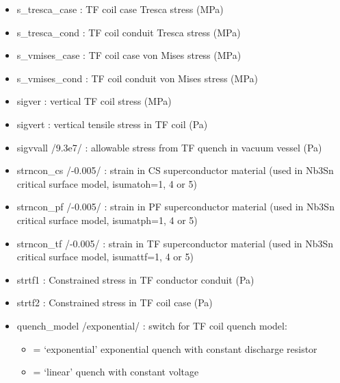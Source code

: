 \documentclass[]{article}
\providecommand{\tightlist}{%
  \setlength{\itemsep}{0pt}\setlength{\parskip}{0pt}}
\begin{document}
\begin{itemize}
\begin{itemize}
  \item
    s\_tresca\_case : TF coil case Tresca stress (MPa)
  \item
    s\_tresca\_cond : TF coil conduit Tresca stress (MPa)
  \item
    s\_vmises\_case : TF coil case von Mises stress (MPa)
  \item
    s\_vmises\_cond : TF coil conduit von Mises stress (MPa)
  \item
    sigver : vertical TF coil stress (MPa)
  \item
    sigvert : vertical tensile stress in TF coil (Pa)
  \item
    sigvvall /9.3e7/ : allowable stress from TF quench in vacuum vessel
    (Pa)
  \item
    strncon\_cs /-0.005/ : strain in CS superconductor material (used in
    Nb3Sn critical surface model, isumatoh=1, 4 or 5)
  \item
    strncon\_pf /-0.005/ : strain in PF superconductor material (used in
    Nb3Sn critical surface model, isumatph=1, 4 or 5)
  \item
    strncon\_tf /-0.005/ : strain in TF superconductor material (used in
    Nb3Sn critical surface model, isumattf=1, 4 or 5)
  \item
    strtf1 : Constrained stress in TF conductor conduit (Pa)
  \item
    strtf2 : Constrained stress in TF coil case (Pa)
  \item
    quench\_model /exponential/ : switch for TF coil quench model:

    \begin{itemize}
    \tightlist
    \item
      = `exponential' exponential quench with constant discharge
      resistor
    \item
      = `linear' quench with constant voltage
    \end{itemize}


\end{itemize}
\end{itemize}
\end{document}
